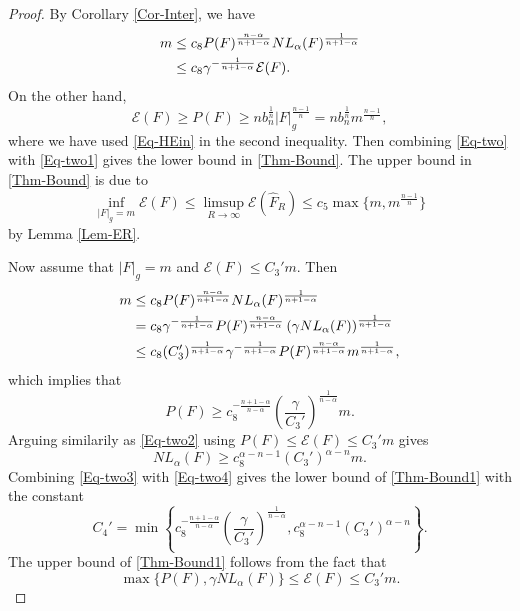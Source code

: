 \documentclass[11pt,reqno]{amsart}
\theoremstyle{definition}
\theoremstyle{remark}
\numberwithin{equation}{section}
\renewcommand{\(}{\left(}
\renewcommand{\)}{\right)}
\renewcommand{\-}{\overline}
\begin{document}
 \begin{proof}
 	By Corollary \ref{Cor-Inter}, we have
 \begin{align}
 	m&\leq c_8P(F)^{\frac{n-\alpha}{n+1-\alpha}}NL_{\alpha}(F)^{\frac{1}{n+1-\alpha}}\notag\\
 	&\leq c_8\gamma^{-\frac{1}{n+1-\alpha}}\mathcal{E}(F).\label{Eq-two}
 \end{align}
 On the other hand,
 \begin{equation}\label{Eq-two1}
 	\mathcal{E}(F)\geq P(F)\geq n b_n^{\frac{1}{n}}|F|_g^{\frac{n-1}{n}}=n b_n^{\frac{1}{n}} m^{\frac{n-1}{n}},
 \end{equation}
 where we have used \eqref{Eq-HEin} in the second inequality. Then combining \eqref{Eq-two} with \eqref{Eq-two1} gives the lower bound in \eqref{Thm-Bound}. The upper bound in \eqref{Thm-Bound} is due to 
 \begin{equation*}
  \inf_{|F|_g=m}{\mathcal{E}(F)}\leq \limsup_{R\to\infty}\mathcal{E}({\widehat{F}_R})\leq c_5\max\{m,m^{\frac{n-1}{n}}\}
\end{equation*}
by Lemma \ref{Lem-ER}.

Now assume that $|F|_g=m$ and $\mathcal{E}(F)\leq C_3' m$.
Then 
\begin{align}
	m&\leq c_8P(F)^{\frac{n-\alpha}{n+1-\alpha}}NL_{\alpha}(F)^{\frac{1}{n+1-\alpha}}\notag\\
	&=c_8\gamma^{-\frac{1}{n+1-\alpha}}P(F)^{\frac{n-\alpha}{n+1-\alpha}}\left(\gamma NL_{\alpha}(F)\right)^{\frac{1}{n+1-\alpha}}\notag\\
	&\leq c_8 (C_3')^{\frac{1}{n+1-\alpha}}\gamma^{-\frac{1}{n+1-\alpha}}P(F)^{\frac{n-\alpha}{n+1-\alpha}}m^{\frac{1}{n+1-\alpha}},\label{Eq-two2}
\end{align}
which implies that 
\begin{equation}\label{Eq-two3}
	P(F)\geq c_8^{-\frac{n+1-\alpha}{n-\alpha}}\left(\frac{\gamma}{C_3'}\right)^{\frac{1}{n-\alpha}}m.
\end{equation}
Arguing similarily as \eqref{Eq-two2} using $P(F)\leq \mathcal{E}(F)\leq C_3' m$ gives 
\begin{equation}\label{Eq-two4}
	NL_{\alpha}(F)\geq c_8^{\alpha-n-1}(C_3')^{\alpha-n}m.
\end{equation}
Combining \eqref{Eq-two3} with \eqref{Eq-two4} gives the lower bound of \eqref{Thm-Bound1} with the constant
\begin{equation}\label{EQ-two5}
	C_4'=\min\left\{c_8^{-\frac{n+1-\alpha}{n-\alpha}}\left(\frac{\gamma}{C_3'}\right)^{\frac{1}{n-\alpha}}, c_8^{\alpha-n-1}(C_3')^{\alpha-n}\right\}.
\end{equation}
The upper bound of \eqref{Thm-Bound1} follows from the fact that
\begin{equation*}
	\max\{P(F),\gamma NL_{\alpha}(F)\}\leq\mathcal{E}(F)\leq C_3' m.
\end{equation*}
 \end{proof}
\end{document}

